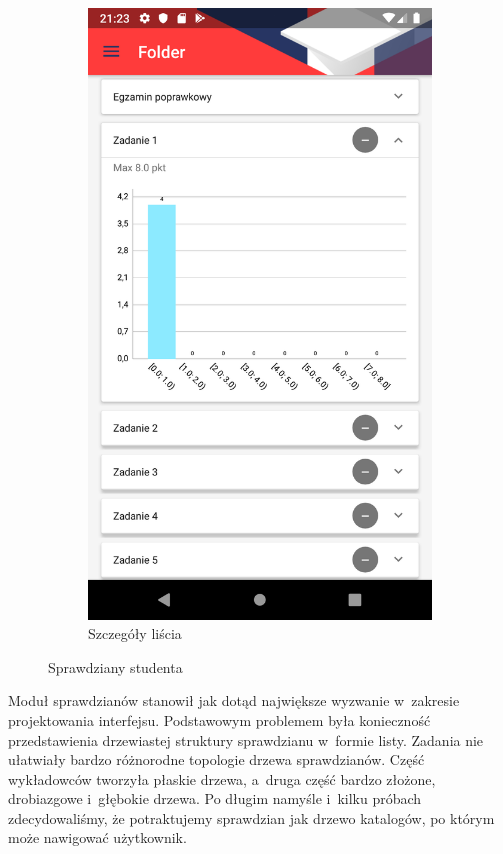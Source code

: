 \documentclass{pracamgr}
\begin{document}
\begin{figure}[p]
\begin{subfigure}[t]{0.3\textwidth}
		\includegraphics[width=\textwidth]{img/tests_details.png}
		\caption{Szczegóły liścia}
		\label{fig:tests_details}
	\end{subfigure}
	\caption{Sprawdziany studenta}\label{fig:tests}
	\medskip
\end{figure}

Moduł sprawdzianów stanowił jak dotąd największe wyzwanie w~zakresie projektowania
interfejsu. Podstawowym problemem była konieczność przedstawienia drzewiastej
struktury sprawdzianu w~formie listy. Zadania nie ułatwiały bardzo różnorodne
topologie drzewa sprawdzianów. Część wykładowców tworzyła płaskie drzewa, a~druga
część bardzo złożone, drobiazgowe i~głębokie drzewa. Po długim namyśle i~kilku próbach
zdecydowaliśmy, że potraktujemy sprawdzian jak drzewo katalogów, po którym może
nawigować użytkownik.
\end{document}
